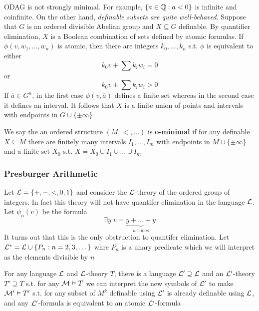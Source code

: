 \documentclass[11pt]{article}
\begin{document}
ODAG is not strongly minimal. For example, \(\{a\in\mathbb{Q}:a<0\}\) is infinite
and coinfinite. On the other hand, \emph{definable subsets are quite
well-behaved}. Suppose that \(G\) is an ordered divisible Abelian group and
\(X\subseteq G\) definable. By quantifier elimination, \(X\) is a Boolean
combination of sets defined by atomic formulas. If \(\phi(v,w_1,\dots,w_n)\)
is atomic, then there are integers \(k_0,\dots,k_n\) s.t. \(\phi\) is equivalent
to either
\begin{equation*}
k_0v+\sum k_iw_i=0
\end{equation*}
or
\begin{equation*}
k_0v+\sum k_iw_i>0
\end{equation*}
If \(\overbar{a}\in G^n\), in the first case \(\phi(v,\overbar{a})\) defines
a finite set whereas in the second case it defines an interval. It follows
that \(X\) is a finite union of points and intervals with endpoints in
\(G\cup\{\pm\infty\}\)

\begin{definition}[]
We say the an ordered structure \((M,<,\dots)\) is \textbf{o-minimal} if for any
definable \(X\subseteq M\) there are finitely many intervals
\(I_1,\dots,I_m\) with endpoints in \(M\cup\{\pm\infty\}\) and a finite set
\(X_0\) s.t. \(X=X_0\cup I_1\cup\dots\cup I_m\)
\end{definition}

\subsubsection{Presburger Arithmetic}
\label{sec:org38eb6fc}
Let \(\mathcal{L}=\{+,-,<,0,1\}\) and consider the \(\mathcal{L}\)-theory of the ordered
group of integers.  In fact this theory will not have quantifer elimination
in the language \(\mathcal{L}\). Let \(\psi_n(v)\) be the formula
\begin{equation*}
\exists y\; v=\underbrace{y+\dots+y}_{n\text{-times}}
\end{equation*}
It turns out that this is the only obstruction to quantifer elimination.
Let \(\mathcal{L}^*=\mathcal{L}\cup\{P_n:n=2,3,\dots\}\) whre \(P_n\) is a unary
predicate which we will interpret as the elements divisible by \(n\)

For any language \(\mathcal{L}\) and \(\mathcal{L}\)-theory \(T\), there is a language
\(\mathcal{L}'\supseteq\mathcal{L}\) and an \(\mathcal{L}'\)-theory \(T'\supseteq T\) s.t. for
any \(\mathcal{M}\vDash T\) we can interpret the new symbols of \(\mathcal{L}'\) to
make \(\mathcal{M}'\vDash T'\) s.t. for any subset of \(M^k\) definable using
\(\mathcal{L}'\) is already definable using \(\mathcal{L}\), and any \(\mathcal{L}'\)-formula
is equivalent to an atomic \(\mathcal{L}'\)-formula
\end{document}
